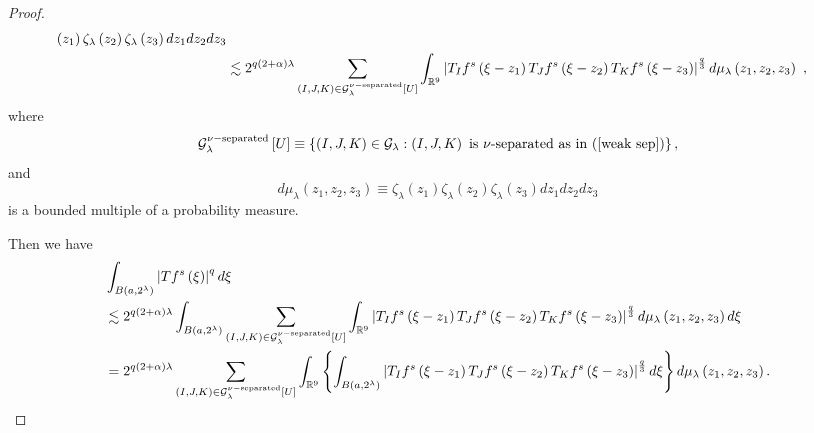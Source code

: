 \documentclass{amsart}%
\theoremstyle{plain}
\numberwithin{equation}{section}
\begin{document}
\begin{proof}
\begin{align*}
{}\left(  z_{1}\right)  \zeta_{\lambda}\left(  z_{2}\right)  \zeta_{\lambda
}\left(  z_{3}\right)  dz_{1}dz_{2}dz_{3}\\
&  \lesssim2^{q\left(  2+\alpha\right)  \lambda}\sum_{\left(  I,J,K\right)
\in\mathcal{G}_{\lambda}^{\nu-\mathop{\rm separated}}\left[  U\right]  }%
\int_{\mathbb{R}^{9}}\left\vert T_{I}f^{s}\left(  \xi-z_{1}\right)  T_{J}%
f^{s}\left(  \xi-z_{2}\right)  T_{K}f^{s}\left(  \xi-z_{3}\right)  \right\vert
^{\frac{q}{3}}d\mu_{\lambda}\left(  z_{1},z_{2},z_{3}\right)  \ ,
\end{align*}
where
\[
\mathcal{G}_{\lambda}^{\nu-\mathop{\rm separated}}\left[  U\right]
\equiv\left\{  \left(  I,J,K\right)  \in\mathcal{G}_{\lambda}:\left(
I,J,K\right)  \text{ is }\nu\text{-separated as in (\ref{weak sep})}\right\}
,
\]
and%
\[
d\mu_{\lambda}\left(  z_{1},z_{2},z_{3}\right)  \equiv\zeta_{\lambda}\left(
z_{1}\right)  \zeta_{\lambda}\left(  z_{2}\right)  \zeta_{\lambda}\left(
z_{3}\right)  dz_{1}dz_{2}dz_{3}%
\]
is a bounded multiple of a probability measure.

Then we have%
\begin{align*}
&  \int_{B\left(  a,2^{\lambda}\right)  }\left\vert Tf^{s}\left(  \xi\right)
\right\vert ^{q}d\xi\\
&  \lesssim2^{q\left(  2+\alpha\right)  \lambda}\int_{B\left(  a,2^{\lambda
}\right)  }\sum_{\left(  I,J,K\right)  \in\mathcal{G}_{\lambda}^{\nu
-\mathop{\rm separated}}\left[  U\right]  }\int_{\mathbb{R}^{9}}\left\vert
T_{I}f^{s}\left(  \xi-z_{1}\right)  T_{J}f^{s}\left(  \xi-z_{2}\right)
T_{K}f^{s}\left(  \xi-z_{3}\right)  \right\vert ^{\frac{q}{3}}d\mu_{\lambda
}\left(  z_{1},z_{2},z_{3}\right)  d\xi\\
&  =2^{q\left(  2+\alpha\right)  \lambda}\sum_{\left(  I,J,K\right)
\in\mathcal{G}_{\lambda}^{\nu-\mathop{\rm separated}}\left[  U\right]  }%
\int_{\mathbb{R}^{9}}\left\{  \int_{B\left(  a,2^{\lambda}\right)  }\left\vert
T_{I}f^{s}\left(  \xi-z_{1}\right)  T_{J}f^{s}\left(  \xi-z_{2}\right)
T_{K}f^{s}\left(  \xi-z_{3}\right)  \right\vert ^{\frac{q}{3}}d\xi\right\}
d\mu_{\lambda}\left(  z_{1},z_{2},z_{3}\right)  .
\end{align*}



\end{proof}
\end{document}
